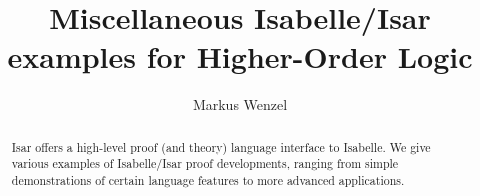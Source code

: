 






\title{Miscellaneous Isabelle/Isar examples for Higher-Order Logic}
\author{Markus Wenzel}
\maketitle

\begin{abstract}
  Isar offers a high-level proof (and theory) language interface to Isabelle.
  We give various examples of Isabelle/Isar proof developments, ranging from
  simple demonstrations of certain language features to more advanced
  applications.
\end{abstract}

\tableofcontents




